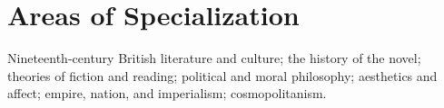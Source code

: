 \documentclass[10pt,letterpaper]{article}
\renewenvironment{itemize}{
  \begin{list}{}{
    \setlength{\leftmargin}{1.5em}
    \setlength{\itemsep}{0.25em}
    \setlength{\parskip}{0pt}
    \setlength{\parsep}{0.25em}
  }
}{
  \end{list}
}
\begin{document}
%

\section*{Areas of Specialization}

\begin{itemize}
\item Nineteenth-century British literature and culture; the history of the novel; theories of fiction and reading; political and moral philosophy; aesthetics and affect; empire, nation, and imperialism; cosmopolitanism.
\end{itemize}



% 
\end{document}
